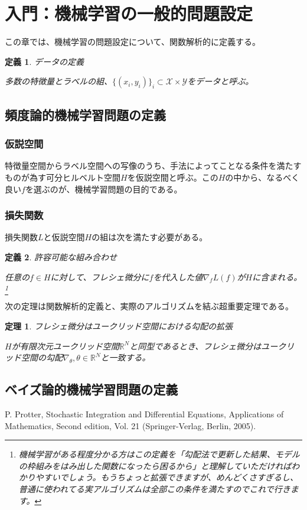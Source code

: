 \documentclass{jsarticle}
\newtheorem{theo}{定理}[section]
\newtheorem{defi}{定義}[section]
\begin{document}
\newpage

\section{入門：機械学習の一般的問題設定}

この章では、機械学習の問題設定について、関数解析的に定義する。

\begin{defi} データの定義

多数の特徴量とラベルの組、$\{(x_i,y_i)\}_i\subset \mathcal{X}\times \mathcal{Y}$をデータと呼ぶ。

\end{defi}

\subsection{頻度論的機械学習問題の定義}



\subsubsection{仮説空間}

特徴量空間からラベル空間への写像のうち、手法によってことなる条件を満たすものが為す可分ヒルベルト空間$H$を仮説空間と呼ぶ。この$H$の中から、なるべく良い$f$を選ぶのが、機械学習問題の目的である。



\subsubsection{損失関数}

損失関数$L$と仮説空間$H$の組は次を満たす必要がある。
\begin{defi} 許容可能な組み合わせ

任意の$f\in H$に対して、フレシェ微分に$f$を代入した値$\nabla_fL(f)$が$H$に含まれる。
\footnote{機械学習がある程度分かる方はこの定義を「勾配法で更新した結果、モデルの枠組みをはみ出した関数になったら困るから」と理解していただければわかりやすいでしょう。もうちょっと拡張できますが、めんどくさすぎるし、普通に使われてる実アルゴリズムは全部この条件を満たすのでこれで行きます。}
\end{defi}






次の定理は関数解析的定義と、実際のアルゴリズムを結ぶ超重要定理である。

\begin{theo}フレシェ微分はユークリッド空間における勾配の拡張

$H$が有限次元ユークリッド空間$\mathbb{R}^N$と同型であるとき、フレシェ微分はユークリッド空間の勾配$\nabla_\theta,\theta\in\mathbb{R}^N$と一致する。

\end{theo}

\subsection{ベイズ論的機械学習問題の定義}





\newpage
\begin{thebibliography}{99}
    P. Protter, Stochastic Integration and Differential Equations, Applications of Mathematics, Second edition, Vol. 21 (Springer-Verlag, Berlin, 2005).
\end{thebibliography}
\end{document}
